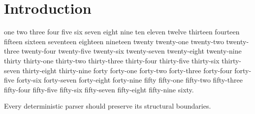 \section{Introduction}
one two three four five six seven eight nine ten eleven twelve thirteen fourteen fifteen sixteen seventeen eighteen nineteen twenty twenty-one twenty-two twenty-three twenty-four twenty-five twenty-six twenty-seven twenty-eight twenty-nine thirty thirty-one thirty-two thirty-three thirty-four thirty-five thirty-six thirty-seven thirty-eight thirty-nine forty forty-one forty-two forty-three forty-four forty-five forty-six forty-seven forty-eight forty-nine fifty fifty-one fifty-two fifty-three fifty-four fifty-five fifty-six fifty-seven fifty-eight fifty-nine sixty.
\begin{theorem}
Every deterministic parser should preserve its structural boundaries.
\end{theorem}
